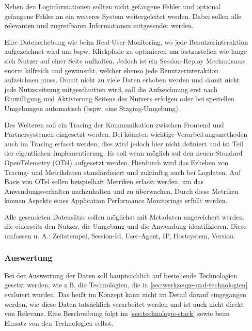 		Neben den Loginformationen sollten nicht gefangene Fehler und optional gefangene Fehler an ein weiteres System weitergeleitet werden. Dabei sollen alle relevanten und zugreifbaren Informationen mitgesendet werden.
		
		Eine Datenerhebung wie beim Real-User-Monitoring, wo jede Benutzerinteraktion aufgezeichnet wird um bspw. Klickpfade zu optimieren um festzustellen wie lange sich Nutzer auf einer Seite aufhalten. Jedoch ist ein Session-Replay Mechanismus enorm hilfreich und gewünscht, welcher ebenso jede Benutzerinteraktion aufzeichnen muss. Damit nicht zu viele Daten erhoben werden und damit nicht jede Nutzersitzung mitgeschnitten wird, soll die Aufzeichnung erst nach Einwilligung und Aktivierung Seitens des Nutzers erfolgen oder bei speziellen Umgebungen automatisch (bspw. eine Staging-Umgebung).
		
		Des Weiteren soll ein Tracing der Kommunikation zwischen Frontend und Partnersystemen eingesetzt werden. Bei könnten wichtige Verarbeitungsmethoden auch im Tracing erfasst werden, dies wird jedoch hier nicht definiert und ist Teil der eigentlichen Implementierung. Es soll wenn möglich auf den neuen Standard OpenTelemetry (OTel) aufgesetzt werden. Hierdurch wird das Erheben von Tracing- und Metrikdaten standardisiert und zukünftig auch bei Logdaten. Auf Basis von OTel sollen beispielhaft Metriken erfasst werden, um das Anwendungsverhalten nachzuhalten und zu überwachen. Durch diese Metriken können Aspekte eines Application Performance Monitorings erfüllt werden.
		
		Alle gesendeten Datensätze sollen möglichst mit Metadaten angereichert werden, die einerseits den Nutzer, die Umgebung und die Anwendung identifizieren. Diese umfassen u. A.: Zeitstempel, Session-Id, User-Agent, IP, Hostsystem, Version.
		
		\subsubsection{Auswertung}
		
		Bei der Auswertung der Daten soll hauptsächlich auf bestehende Technologien gesetzt werden, wie z.B. die Technologien, die in \autoref{sec:werkzeuge-und-technologien} evaluiert wurden. Das heißt im Konzept kann nicht im Detail darauf eingegangen werden, wie diese Daten tatsächlich verarbeitet werden und ist auch nicht direkt von Relevanz. Eine Beschreibung folgt im \autoref{sec:technologie-stack} sowie beim Einsatz von den Technologien selbst.
		
